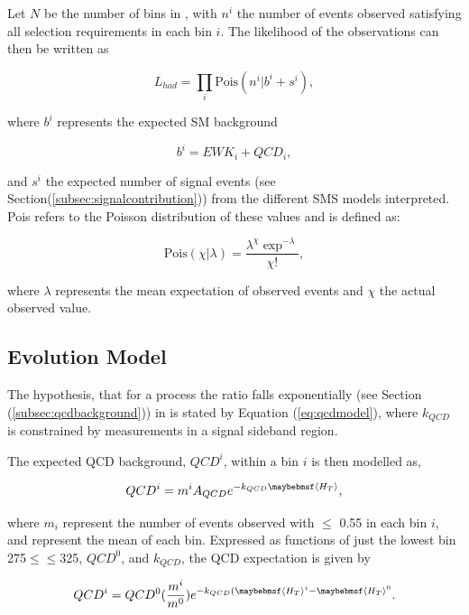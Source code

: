Let $N$ be the number of bins in \theht, with $n^{i}$ the number of events observed satisfying all selection requirements in each \theht bin $i$. The likelihood of the observations can then be written as

\begin{equation}
L_{had} =   \prod_{i}\text{Pois}(n^{i}\rvert b^{i} + s^{i}),
\end{equation}

where $b^{i}$ represents the expected \ac{SM} background 

\begin{equation}
\label{eq:totbacksum}
b^{i} = EWK_{i} + QCD_{i},
\end{equation}

and $s^{i}$ the expected number of signal events (see Section(\ref{subsec:signalcontribution})) from the different \ac{SMS} models interpreted. Pois refers to the Poisson distribution of these values and is defined as:

\begin{equation}
\text{Pois}(\chi\rvert\lambda) = \frac{\lambda^{\chi}\exp^{-\lambda}}{\chi!},
\end{equation}
 
where $\lambda$ represents the mean expectation of observed events and $\chi$ the actual observed value.
 
\subsection{\theht Evolution Model}
\label{subsec:htevolution}

The hypothesis, that for a process the \alphat ratio falls exponentially (see Section (\ref{subsec:qcdbackground})) in \theht is stated by Equation (\ref{eq:qcdmodel}), where $k_{QCD}$ is constrained by measurements in a signal sideband region. 

The expected QCD background, $QCD^{i}$, within a bin $i$ is then modelled as,

\begin{equation}
QCD^{i} = m^{i}A_{QCD}e^{-k_{QCD}\meanht},
\end{equation}

where $m_{i}$ represent the number of events observed with \alphat $\leq$ 0.55 in each \theht bin $i$, and \meanht represent the mean \theht of each bin. Expressed as functions of just the lowest \theht bin 275$\leq$\theht$\leq$325, $QCD^{0}$, and $k_{QCD}$, the QCD expectation is given by

\begin{equation}
QCD^{i} = QCD^{0}(\frac{m^{i}}{m^{0}})e^{-k_{QCD}(\meanht^{i}-\meanht^{0}}.
\end{equation} 


